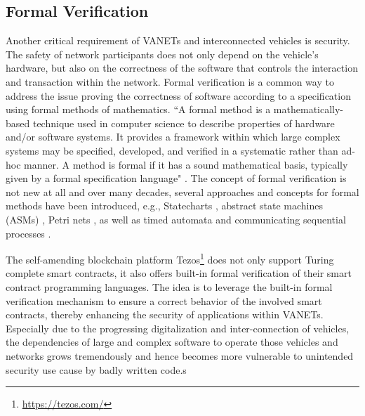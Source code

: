 \documentclass{llncs}
\begin{document}
{		%
		
		\subsection{Formal Verification}
			\label{ss:formal-verification}

			Another critical requirement of VANETs and interconnected vehicles is security. The safety of network participants does not only depend on the vehicle's hardware, but also on the correctness of the software that controls the interaction and transaction within the network. Formal verification is a common way to address the issue proving the correctness of software according to a specification using formal methods of mathematics. ``A formal method is a mathematically-based technique used in computer science to describe properties of hardware and/or software systems. It provides a framework within which large complex systems may be specified, developed, and verified in a systematic rather than ad-hoc manner. A method is formal if it has a sound mathematical basis, typically given by a formal specification language" \cite{wing1990specifier}. The concept of formal verification is not new at all and over many decades, several approaches and concepts for formal methods have been introduced, e.g., Statecharts \cite{harel1987statecharts}, abstract state machines (ASMs) \cite{gurevich1995evolving}, Petri nets \cite{petri1962kommunikation}, as well as timed automata \cite{alur1994theory} and communicating sequential processes \cite{hoare1978communicating}.
						
			The self-amending blockchain platform Tezos\footnote{\url{https://tezos.com/}} \cite{tezosWhitepaper} does not only support Turing complete smart contracts, it also offers built-in formal verification of their smart contract programming languages. The idea is to leverage the built-in formal verification mechanism to ensure a correct behavior of the involved smart contracts, thereby enhancing the security of applications within VANETs. Especially due to the progressing digitalization and inter-connection of vehicles, the dependencies of large and complex software to operate those vehicles and networks grows tremendously and hence becomes more vulnerable to unintended security use cause by badly written code.s

			
		
}
\end{document}
